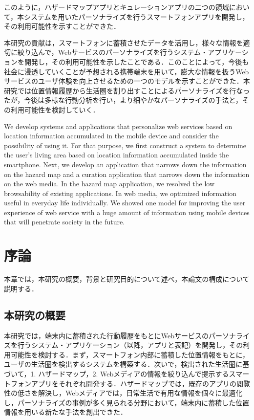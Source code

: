 \documentclass[a4paper]{jsarticle}
\begin{document}
このように，ハザードマップアプリとキュレーションアプリの二つの領域において，本システムを用いたパーソナライズを行うスマートフォンアプリを開発し，その利用可能性を示すことができた．

本研究の貢献は，スマートフォンに蓄積させたデータを活用し，様々な情報を適切に絞り込んで，Webサービスのパーソナライズを行うシステム・アプリケーションを開発し，その利用可能性を示したことである．このことによって，今後も社会に浸透していくことが予想される携帯端末を用いて，膨大な情報を扱うWebサービスのユーザ体験を向上させるための一つのモデルを示すことができた．本研究では位置情報履歴から生活圏を割り出すことによるパーソナライズを行なったが，今後は多様な行動分析を行い，より細やかなパーソナライズの手法と，その利用可能性を検討していく．

We develop systems and applications that personalize web services based on location information accumulated in the mobile device and consider the possibility of using it. For that purpose, we first construct a system to determine the user's living area based on location information accumulated inside the smartphone. Next, we develop an application that narrows down the information on the hazard map and a curation application that narrows down the information on the web media. In the hazard map application, we resolved the low browsability of existing applications. In web media, we optimized information useful in everyday life individually. We showed one model for improving the user experience of web service with a huge amount of information using mobile devices that will penetrate society in the future.
\makemokuji

\newpage

\setcounter{page}{1} %
\section{序論}
本章では，本研究の概要，背景と研究目的について述べ，本論文の構成について説明する．

\subsection{本研究の概要}
本研究では，端末内に蓄積された行動履歴をもとにWebサービスのパーソナライズを行うシステム・アプリケーション（以降，アプリと表記）を開発し，その利用可能性を検討する．まず，スマートフォン内部に蓄積した位置情報をもとに，ユーザの生活圏を検出するシステムを構築する．次いで，検出された生活圏に基づいて，1. ハザードマップ，2. Webメディアの情報を絞り込んで提示するスマートフォンアプリをそれぞれ開発する．ハザードマップでは，既存のアプリの閲覧性の低さを解決し，Webメディアでは，日常生活で有用な情報を個々に最適化し，パーソナライズの事例が多く見られる分野において，端末内に蓄積した位置情報を用いる新たな手法を創出できた．
\end{document}
